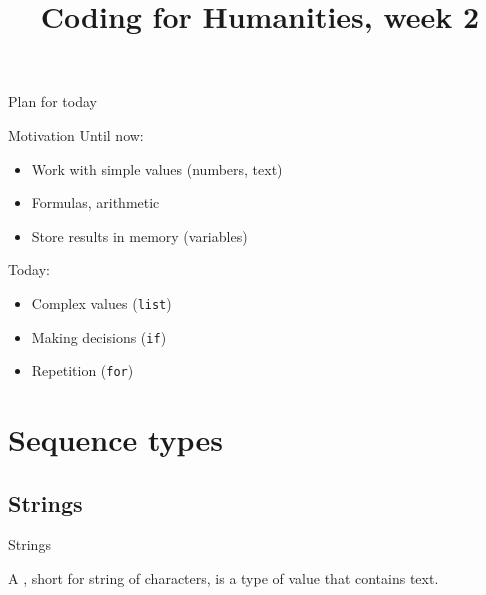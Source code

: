 \documentclass[aspectratio=169,usenames,dvipsnames]{beamer}
\title{Coding for Humanities, week 2}
\begin{document}
\begin{frame}
    \titlepage
\end{frame}

\begin{frame}{Plan for today}
    \tableofcontents
\end{frame}

\begin{frame}{Motivation}
    Until now:
    \begin{itemize}
        \item Work with simple values (numbers, text)
        \item Formulas, arithmetic
        \item Store results in memory (variables)
    \end{itemize}

    \pause
    Today:
    \begin{itemize}
        \item Complex values (\lstinline{list})
        \item Making decisions (\lstinline{if})
        \item Repetition (\lstinline{for})
    \end{itemize}
\end{frame}

\section{Sequence types}
\subsection{Strings}
\frame{\tableofcontents[currentsubsection]}

\begin{frame}{Strings}
    \begin{definition}
        A , short for string of characters,
        is a type of value that contains text.
    \end{definition}

\end{frame}
\end{document}
